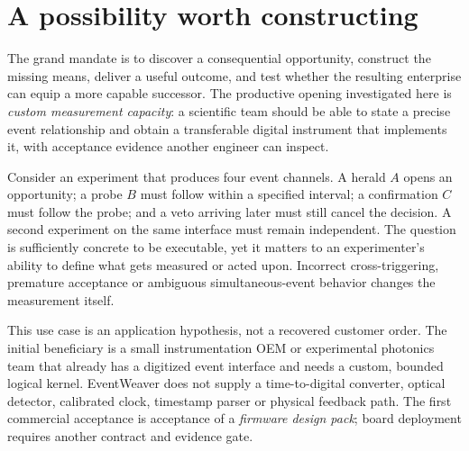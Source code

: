 \section{A possibility worth constructing}
The grand mandate is to discover a consequential opportunity, construct the missing means, deliver a useful outcome, and test whether the resulting enterprise can equip a more capable successor. The productive opening investigated here is \emph{custom measurement capacity}: a scientific team should be able to state a precise event relationship and obtain a transferable digital instrument that implements it, with acceptance evidence another engineer can inspect.

Consider an experiment that produces four event channels. A herald $A$ opens an opportunity; a probe $B$ must follow within a specified interval; a confirmation $C$ must follow the probe; and a veto arriving later must still cancel the decision. A second experiment on the same interface must remain independent. The question is sufficiently concrete to be executable, yet it matters to an experimenter's ability to define what gets measured or acted upon. Incorrect cross-triggering, premature acceptance or ambiguous simultaneous-event behavior changes the measurement itself.

This use case is an application hypothesis, not a recovered customer order. The initial beneficiary is a small instrumentation OEM or experimental photonics team that already has a digitized event interface and needs a custom, bounded logical kernel. EventWeaver does not supply a time-to-digital converter, optical detector, calibrated clock, timestamp parser or physical feedback path. The first commercial acceptance is acceptance of a \emph{firmware design pack}; board deployment requires another contract and evidence gate.

